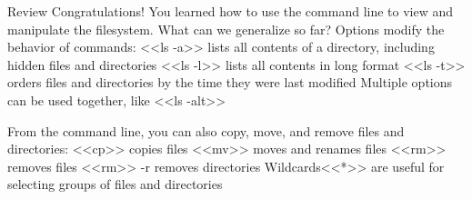 Review
    Congratulations! You learned how to use the command line to view and manipulate the filesystem. What can we generalize so far?
        Options modify the behavior of commands:
            <<ls -a>> lists all contents of a directory, including hidden files and directories
            <<ls -l>> lists all contents in long format
            <<ls -t>> orders files and directories by the time they were last modified
            Multiple options can be used together, like <<ls -alt>>
        
        From the command line, you can also copy, move, and remove files and directories:
            <<cp>> copies files
            <<mv>> moves and renames files
            <<rm>> removes files
            <<rm>> -r removes directories
            Wildcards<<*>> are useful for selecting groups of files and directories